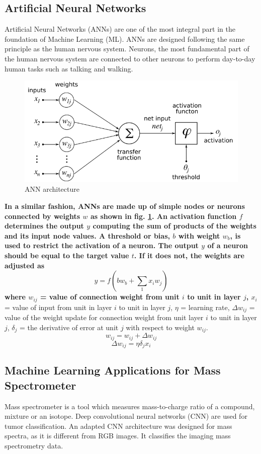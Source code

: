 \documentclass[12pt, a4paper]{article}
\begin{document}
\subsection{Artificial Neural Networks}
Artificial Neural Networks (ANNs) are one of the most integral part in the foundation of Machine Learning (ML). ANNs are designed following the same principle as the human nervous system. Neurons, the most fundamental part of the human nervous system are connected to other neurons to  perform day-to-day human tasks such as talking and walking. \begin{figure}[!ht]
\centering
    \begin{center}
        \includegraphics[width = 13.5 cm]{Artificial-Neuron.png}
    \end{center}
    \caption{ANN architecture}
    \label{fig:Architecture of an ANN}
\end{figure} \textbf{In a similar fashion, ANNs are made up of simple nodes or neurons connected by weights $w$ as shown in fig. \ref{fig:Architecture of an ANN}. An activation function $f$ determines the output $y$ computing the sum of products of the weights and its input node values. A threshold or bias, $b$ with weight $w_{b}$, is  used to restrict the activation of a neuron. The output $y$ of a neuron should be equal to the target value $t$. If it does not, the weights are adjusted as $$y = f (bw_{b} + \sum\limits_{1} x_{i}w_{j})$$ where $w_{ij}$ = value of connection weight from unit $i$ to unit in layer $j$, $x_{i}$} = value of input from unit in layer $i$ to unit in layer $j$, $\eta$ = learning rate, $\Delta w_{ij}$ = value of the weight update for connection weight from unit layer $i$ to unit in layer $j$, $\delta_{j}$ = the derivative of error at unit $j$ with respect to weight $w_{ij}$. $$w_{ij} = w_{ij} + \Delta w_{ij}$$ $$\Delta w_{ij} = \eta\delta_{j}x_{i}$$

\subsection{Machine Learning Applications for Mass Spectrometer}
Mass spectrometer is a tool which measures mass-to-charge ratio of a compound, mixture or an isotope. Deep convolutional neural networks (CNN) are used for tumor classification. An adapted CNN architecture was designed for mass spectra, as it is different from RGB images. It classifies the imaging mass spectrometry data.
\end{document}
